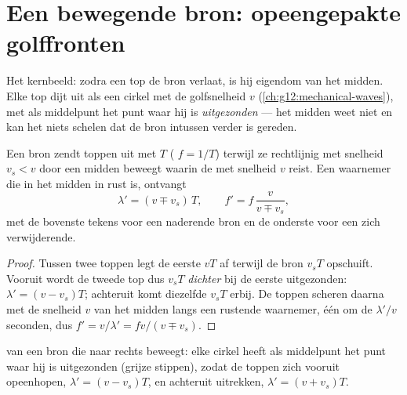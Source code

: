 \section{Een bewegende bron: opeengepakte golffronten}

Het kernbeeld: zodra een top de bron verlaat, is hij eigendom van het
midden. Elke top dijt uit als een cirkel met de golfsnelheid $v$
(\cref{ch:g12:mechanical-waves}), met als middelpunt het punt waar hij is
\emph{uitgezonden} --- het midden weet niet en kan het niets schelen dat
de bron intussen verder is gereden.

\begin{proposition}\label{prop:g12:doppler-effect:moving-source}
Een bron zendt toppen uit met  $T$ ( $f = 1/T$) terwijl
ze rechtlijnig met snelheid $v_s < v$ door een midden beweegt waarin de
 met snelheid $v$ reist. Een waarnemer die in het midden in rust is,
ontvangt
\[
\lambda' = (v \mp v_s)\,T, \qquad f' = f\,\frac{v}{v \mp v_s},
\]
met de bovenste tekens voor een naderende bron en de onderste voor een
zich verwijderende.
\end{proposition}

\begin{proof}
Tussen twee toppen legt de eerste $vT$ af terwijl de bron $v_s T$
opschuift. Vooruit wordt de tweede top dus $v_s T$ \emph{dichter} bij de
eerste uitgezonden: $\lambda' = (v - v_s)T$; achteruit komt diezelfde
$v_s T$ erbij. De toppen scheren daarna met de snelheid $v$ van het midden
langs een rustende waarnemer, één om de $\lambda'/v$ seconden, dus
$f' = v/\lambda' = f v/(v \mp v_s)$.
\end{proof}

\begin{omfigure}

{\small {} van een bron die naar rechts beweegt: elke cirkel
heeft als middelpunt het punt waar hij is uitgezonden (grijze stippen),
zodat de toppen zich vooruit opeenhopen, $\lambda' = (v - v_s)T$, en
achteruit uitrekken, $\lambda' = (v + v_s)T$.}
\end{omfigure}


